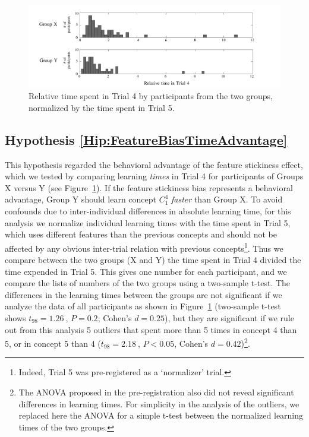  
 \begin{figure}
\begin{center}
	\includegraphics[scale=.5]{papers/images_behavior_research_methods/results_2.pdf}
\end{center}\caption{Relative time spent in Trial 4 by participants from the two groups, normalized by the time spent in Trial 5.}
\label{fig:results2}
\end{figure}



\subsection{Hypothesis \ref{Hip:FeatureBiasTimeAdvantage}}\label{Results:FeatureBiasTimeAdvantage} 
This hypothesis regarded the behavioral advantage of the feature stickiness effect, which we tested by comparing learning \emph{times} in Trial 4 for participants of Groups X versus Y (see Figure~\ref{fig:results2}).
If the feature stickiness bias represents a behavioral advantage, Group Y should learn concept $C^4_1$ \emph{faster} than Group X. To avoid confounds due to inter-individual differences in absolute learning time, for this analysis we normalize individual learning times with the time spent in Trial 5, which uses different features than the previous concepts and should not be affected by any obvious inter-trial relation with previous concepts\footnote{Indeed, Trial 5 was pre-registered as a `normalizer' trial.}. Thus we compare between the two groups (X and Y) the time spent in Trial 4 divided the time expended in Trial 5. This gives one number for each participant, and we compare the lists of numbers of the two groups using a two-sample t-test.  The differences in the learning times between the groups are not significant if we analyze the data of all participants as shown in Figure~\ref{fig:results2} (two-sample t-test shows $t_{98}=1.26 \ $,  $P=0.2$; Cohen's $d=0.25$), but they are significant if we rule out from this analysis 5 outliers that spent more than 5 times in concept 4 than 5, or in concept 5 than 4 ($t_{98}=2.18 \ $,  $P<0.05$, Cohen's $d=0.42$)\footnote{The ANOVA proposed in the pre-registration also did not reveal significant differences in learning times. For simplicity in the analysis of the outliers, we replaced here the ANOVA for a simple t-test between the normalized learning times of the two groups.}.




